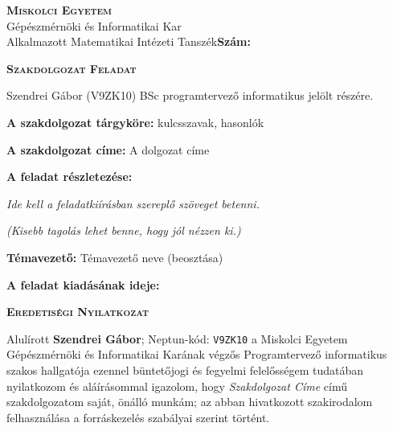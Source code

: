 \noindent
\textsc{\textbf{Miskolci Egyetem}}\\
Gépészmérnöki és Informatikai Kar\\
Alkalmazott Matematikai Intézeti Tanszék\hspace*{4cm}\hfil \textbf{Szám:}

\vspace{0.5cm}
\begin{center}
\large\textsc{\textbf{Szakdolgozat Feladat}}
\end{center}
\vspace{0.5cm}

Szendrei Gábor (V9ZK10) BSc programtervező informatikus jelölt részére.

\bigskip
\noindent\textbf{A szakdolgozat tárgyköre:} kulcsszavak, hasonlók

\bigskip
\noindent\textbf{A szakdolgozat címe:} A dolgozat címe

\bigskip
\noindent\textbf{A feladat részletezése:}

\medskip

\emph{Ide kell a feladatkiírásban szereplő szöveget betenni.}

\medskip

\emph{(Kisebb tagolás lehet benne, hogy jól nézzen ki.)}

\vfill

\noindent\textbf{Témavezető:} Témavezető neve (beosztása)


\bigskip
\noindent\textbf{A feladat kiadásának ideje:}


\vspace{1.5cm}

\hfill\makebox[6cm]{\dotfill}

\hfill{}

\clearpage

\vspace*{1cm}  
\begin{center}
\large\textsc{\textbf{Eredetiségi Nyilatkozat}}
\end{center}
\vspace*{2cm}  

Alulírott \textbf{Szendrei Gábor}; Neptun-kód: \texttt{V9ZK10} a Miskolci Egyetem Gépészmérnöki és Informatikai Karának végzős Programtervező informatikus szakos hallgatója ezennel büntetőjogi és fegyelmi felelősségem tudatában nyilatkozom és aláírásommal igazolom, hogy \textit{Szakdolgozat Címe}
című szakdolgozatom saját, önálló munkám; az abban hivatkozott szakirodalom
felhasználása a forráskezelés szabályai szerint történt.

